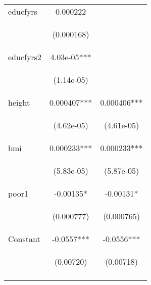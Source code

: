\documentclass{article}[11pt,subeqn]
\begin{document}
\begin{spacing}{1.25}
\begin{table}[ht]
\begin{center}
\begin{tabular}{lcc}
educfyrs & 0.000222 &  \\
\vspace{4pt} & \begin{footnotesize}(0.000168)\end{footnotesize} & \begin{footnotesize}\end{footnotesize} \\
educfyrs2 & 4.03e-05*** &  \\
\vspace{4pt} & \begin{footnotesize}(1.14e-05)\end{footnotesize} & \begin{footnotesize}\end{footnotesize} \\
height & 0.000407*** & 0.000406*** \\
\vspace{4pt} & \begin{footnotesize}(4.62e-05)\end{footnotesize} & \begin{footnotesize}(4.61e-05)\end{footnotesize} \\
bmi & 0.000233*** & 0.000233*** \\
\vspace{4pt} & \begin{footnotesize}(5.83e-05)\end{footnotesize} & \begin{footnotesize}(5.87e-05)\end{footnotesize} \\
poor1 & -0.00135* & -0.00131* \\
\vspace{4pt} & \begin{footnotesize}(0.000777)\end{footnotesize} & \begin{footnotesize}(0.000765)\end{footnotesize} \\
Constant & -0.0557*** & -0.0556*** \\
 & \begin{footnotesize}(0.00720)\end{footnotesize} & \begin{footnotesize}(0.00718)\end{footnotesize} \\
\vspace{4pt} & \begin{footnotesize}\end{footnotesize} & \begin{footnotesize}\end{footnotesize} \\

\end{tabular}
\end{center}
\end{table}
\end{spacing}
\end{document}

